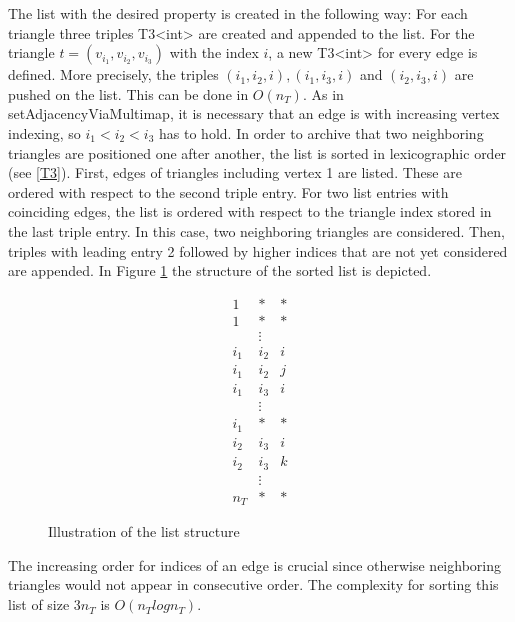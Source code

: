 \documentclass[10pt]{article}
\begin{document}
The list with the desired property is created in the following way: For each triangle three triples {\ttfamily T3<int>} are created and appended to the list. For the triangle $t = (v_{i_1},v_{i_2},v_{i_3})$ with the index $i$, a new {\ttfamily T3<int>} for every edge is defined. More precisely, the triples $({i_1},{i_2},i), ({i_1},{i_3},i)$ and $({i_2},{i_3},i)$ are pushed on the list. This can be done in $O(n_T)$. As in {\ttfamily setAdjacencyViaMultimap}, it is necessary that an edge is with increasing vertex indexing, so $i_1 < i_2 < i_3$ has to hold. In order to archive that two neighboring triangles are positioned one after another, the list is sorted in lexicographic order (see \ref{T3}). First, edges of triangles including vertex 1 are listed. These are ordered with respect to the second triple entry. For two list entries with coinciding edges, the list is ordered with respect to the triangle index stored in the last triple entry. In this case, two neighboring triangles are considered. Then, triples with leading entry 2 followed by higher indices that are not yet considered are appended. In Figure \ref{list_ill} the structure of the sorted list is depicted.

\begin{equation*}
\begin{matrix}
1 & * & * \\
1 & * & * \\
& \vdots & \\
i_1 & i_2 & i \\
i_1 & i_2 & j \\
i_1 & i_3 & i \\
& \vdots & \\
i_1 & * & * \\
i_2 & i_3 & i \\
i_2 & i_3 & k \\
& \vdots & \\
n_T & * & * 
\end{matrix}
\end{equation*}
\begin{figure}[h]
	\caption{Illustration of the list structure}
	\label{list_ill}
\end{figure}

The increasing order for indices of an edge is crucial since otherwise neighboring triangles would not appear in consecutive order. The complexity for sorting this list of size $ 3 n_T$ is $O(n_Tlogn_T)$.
\end{document}
